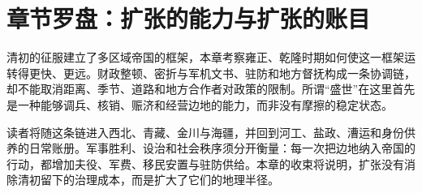 \section{章节罗盘：扩张的能力与扩张的账目}
\label{sec:high-qing-compass}

清初的征服建立了多区域帝国的框架，本章考察雍正、乾隆时期如何使这一框架运转得更快、更远。财政整顿、密折与军机文书、驻防和地方督抚构成一条协调链，却不能取消距离、季节、道路和地方合作者对政策的限制。所谓“盛世”在这里首先是一种能够调兵、核销、赈济和经营边地的能力，而非没有摩擦的稳定状态。

读者将随这条链进入西北、青藏、金川与海疆，并回到河工、盐政、漕运和身份供养的日常账册。军事胜利、设治和社会秩序须分开衡量：每一次把边地纳入帝国的行动，都增加夫役、军费、移民安置与驻防供给。本章的收束将说明，扩张没有消除清初留下的治理成本，而是扩大了它们的地理半径。
